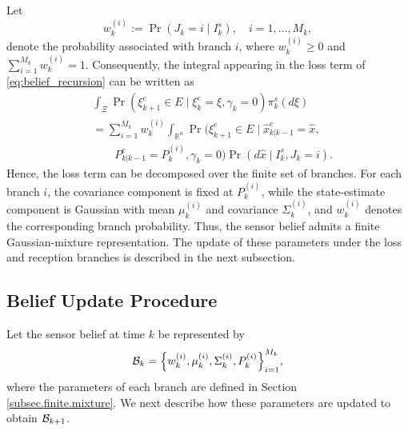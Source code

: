 \documentclass[letterpaper, 10 pt, conference]{ieeeconf}
\begin{document}
Let 
\begin{equation}
    w_k^{(i)}:=\operatorname{Pr}(J_k=i\mid I_k^s),\quad i=1,\dots,M_k,
\end{equation}
denote the probability associated with branch $i$, where $w_k^{(i)}\geq 0$ and $\sum_{i=1}^{M_k}w_k^{(i)}=1$. Consequently, the integral appearing in the loss term of \eqref{eq:belief_recursion} can be written as
\begin{align}\label{finite.mixture.repr}
&\int_{\Xi}
\operatorname{Pr}(\xi^e_{k+1}\in E
\mid \xi_k^e=\xi,\gamma_k=0)\pi_k^s(d\xi)
\nonumber\\
&=
\sum_{i=1}^{M_k} w_k^{(i)}
\int_{\mathbb{R}^n}
\operatorname{Pr}\big(
\xi_{k+1}^e\in E
\mid \hat{x}^e_{k|k-1}=\hat{x},
\nonumber\\
&\qquad
P_{k|k-1}^e=P_k^{(i)},\gamma_k=0
\big)
\operatorname{Pr}(d\hat{x}\mid I_k^s,J_k=i).
\end{align}
Hence, the loss term can be decomposed over the finite set of branches. For each branch $i$, the covariance component is fixed at $P_k^{(i)}$, while the state-estimate component is Gaussian with mean $\mu_k^{(i)}$ and covariance $\Sigma_k^{(i)}$, and $w_k^{(i)}$ denotes the corresponding branch probability. Thus, the sensor belief admits a finite Gaussian-mixture representation.
The update of these parameters under the loss and reception branches is described in the next subsection.

\subsection{Belief Update Procedure}
Let the sensor belief at time $k$  be represented by
\begin{equation}
    {\cal B}_k=\Big\{w_k^{(i)}, \mu_k^{(i)}, \Sigma_k^{(i)},P_k^{(i)}\Big\}_{i=1}^{M_k},
\end{equation}
where the parameters of each branch are defined in Section \ref{subsec.finite.mixture}. We next describe how these parameters are updated to obtain ${\cal B}_{k+1}$.
\end{document}
